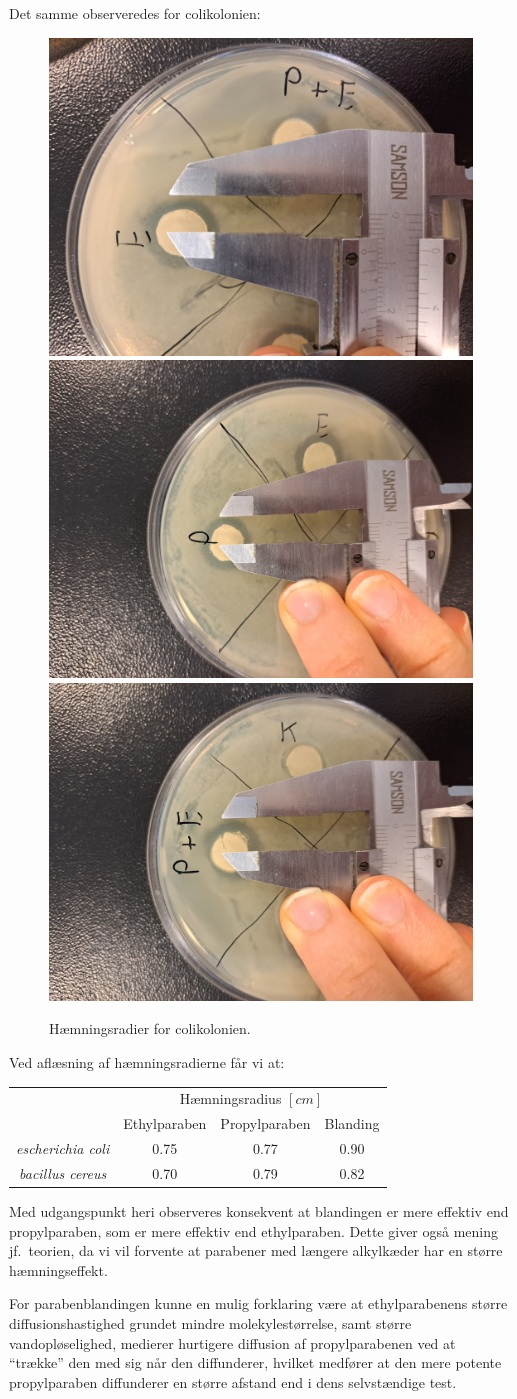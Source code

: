     Det samme observeredes for colikolonien:
    \begin{figure}[H]\centering
        \includegraphics[width=.32\textwidth]{billeder/colie}
        \includegraphics[width=.32\textwidth]{billeder/colip}
        \includegraphics[width=.32\textwidth]{billeder/colipe}
        \caption{Hæmningsradier for colikolonien.}
    \end{figure}
    Ved aflæsning af hæmningsradierne får vi at:
    \begin{table}[H]\centering
        \begin{tabular}{cccc}
            \toprule
            & \multicolumn{3}{c}{Hæmningsradius $\left[\si{cm}\right]$} \\
            \cmidrule(r){2-4}
            & Ethylparaben & Propylparaben & Blanding \\
            \midrule
            \textit{escherichia coli} & 0.75 & 0.77 & 0.90 \\
            \textit{bacillus cereus} & 0.70 & 0.79 & 0.82 \\
            \bottomrule
        \end{tabular}
    \end{table}
    Med udgangspunkt heri observeres konsekvent at blandingen er mere effektiv end propylparaben, som er mere effektiv end ethylparaben. Dette giver også mening jf.\ teorien, da vi vil forvente at parabener med længere alkylkæder har en større hæmningseffekt. 
    
    For parabenblandingen kunne en mulig forklaring være at ethylparabenens større diffusionshastighed grundet mindre molekylestørrelse, samt større vandopløselighed, medierer hurtigere diffusion af propylparabenen ved at ``trække'' den med sig når den diffunderer, hvilket medfører at den mere potente propylparaben diffunderer en større afstand end i dens selvstændige test.
    
